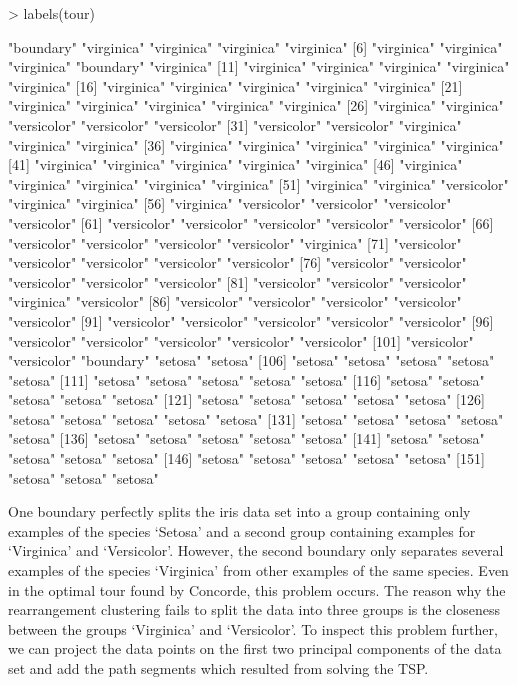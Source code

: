 \documentclass[10pt,a4paper,fleqn]{article}
\begin{document}
\begin{Schunk}
\begin{Sinput}
> labels(tour)
\end{Sinput}
\begin{Soutput}
  [1] "boundary"   "virginica"  "virginica"  "virginica"  "virginica" 
  [6] "virginica"  "virginica"  "virginica"  "boundary"   "virginica" 
 [11] "virginica"  "virginica"  "virginica"  "virginica"  "virginica" 
 [16] "virginica"  "virginica"  "virginica"  "virginica"  "virginica" 
 [21] "virginica"  "virginica"  "virginica"  "virginica"  "virginica" 
 [26] "virginica"  "virginica"  "versicolor" "versicolor" "versicolor"
 [31] "versicolor" "versicolor" "virginica"  "virginica"  "virginica" 
 [36] "virginica"  "virginica"  "virginica"  "virginica"  "virginica" 
 [41] "virginica"  "virginica"  "virginica"  "virginica"  "virginica" 
 [46] "virginica"  "virginica"  "virginica"  "virginica"  "virginica" 
 [51] "virginica"  "virginica"  "versicolor" "virginica"  "virginica" 
 [56] "virginica"  "versicolor" "versicolor" "versicolor" "versicolor"
 [61] "versicolor" "versicolor" "versicolor" "versicolor" "versicolor"
 [66] "versicolor" "versicolor" "versicolor" "versicolor" "virginica" 
 [71] "versicolor" "versicolor" "versicolor" "versicolor" "versicolor"
 [76] "versicolor" "versicolor" "versicolor" "versicolor" "versicolor"
 [81] "versicolor" "versicolor" "versicolor" "virginica"  "versicolor"
 [86] "versicolor" "versicolor" "versicolor" "versicolor" "versicolor"
 [91] "versicolor" "versicolor" "versicolor" "versicolor" "versicolor"
 [96] "versicolor" "versicolor" "versicolor" "versicolor" "versicolor"
[101] "versicolor" "versicolor" "boundary"   "setosa"     "setosa"    
[106] "setosa"     "setosa"     "setosa"     "setosa"     "setosa"    
[111] "setosa"     "setosa"     "setosa"     "setosa"     "setosa"    
[116] "setosa"     "setosa"     "setosa"     "setosa"     "setosa"    
[121] "setosa"     "setosa"     "setosa"     "setosa"     "setosa"    
[126] "setosa"     "setosa"     "setosa"     "setosa"     "setosa"    
[131] "setosa"     "setosa"     "setosa"     "setosa"     "setosa"    
[136] "setosa"     "setosa"     "setosa"     "setosa"     "setosa"    
[141] "setosa"     "setosa"     "setosa"     "setosa"     "setosa"    
[146] "setosa"     "setosa"     "setosa"     "setosa"     "setosa"    
[151] "setosa"     "setosa"     "setosa"    
\end{Soutput}
\end{Schunk}


One boundary perfectly splits the iris data set into a group containing only
examples of the species `Setosa' and a second group containing examples for
`Virginica' and `Versicolor'. However, the second boundary only separates
several examples of the species `Virginica' from other examples of the same
species.  Even in the optimal tour found by Concorde, this problem occurs. The
reason why the rearrangement clustering fails to split the data into three
groups is the closeness between the groups `Virginica' and `Versicolor'. 
To inspect this problem further, we can project the data points
on the first two principal components of the data set and add the path 
segments which resulted from solving the TSP.
\end{document}
